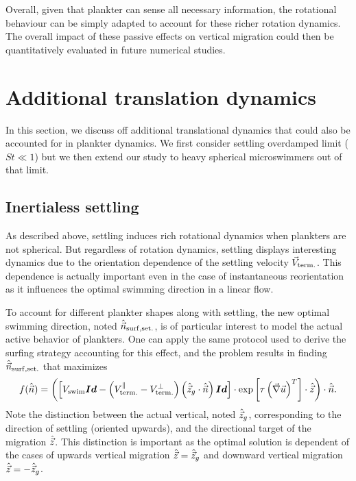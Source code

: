 Overall, given that plankter can sense all necessary information, the rotational behaviour can be simply adapted to account for these richer rotation dynamics.
The overall impact of these passive effects on vertical migration could then be quantitatively evaluated in future numerical studies.

\section{Additional translation dynamics}

In this section, we discuss off additional translational dynamics that could also be accounted for in plankter dynamics.
We first consider settling overdamped limit ($\mathit{St} \ll 1$) but we then extend our study to heavy spherical microswimmers out of that limit.

\subsection{Inertialess settling}\label{sec:passive_processes_inertialess_effects}

As described above, settling induces rich rotational dynamics when plankters are not spherical.
But regardless of rotation dynamics, settling displays interesting dynamics due to the orientation dependence of the settling velocity $\vec{V}_{\mathrm{term.}}$.
This dependence is actually important even in the case of instantaneous reorientation as it influences the optimal swimming direction in a linear flow.

To account for different plankter shapes along with settling, the new optimal swimming direction, noted $\hat{\vec{n}}_{\mathrm{surf, set.}}$, is of particular interest to model the actual active behavior of plankters.
One can apply the same protocol used to derive the surfing strategy accounting for this effect, and the problem results in finding $\hat{\vec{n}}_{\mathrm{surf, set.}}$ that maximizes
\begin{equation}\label{turb:eq:inertialess_settling_maximization}
	f(\hat{\vec{n}}) = \left( \left[ V_{\mathrm{swim}} \boldsymbol{Id} - \left( V_{\mathrm{term.}}^\parallel - V_{\mathrm{term.}}^\perp \right) \left( \hat{\vec{z}}_g \cdot \hat{\vec{n}} \right) \boldsymbol{Id} \right] \cdot \exp \left[ \tau \left( \vec{\nabla} \vec{u} \right)^T \right] \cdot \hat{\vec{z}} \right) \cdot \hat{\vec{n}}.
\end{equation}
Note the distinction between the actual vertical, noted $\hat{\vec{z}}_g$, corresponding to the direction of settling (oriented upwards), and the directional target of the migration $\hat{\vec{z}}$.
This distinction is important as the optimal solution is dependent of the cases of upwards vertical migration $\hat{\vec{z}} = \hat{\vec{z}}_g$ and downward vertical migration  $\hat{\vec{z}} = -\hat{\vec{z}}_g$.

